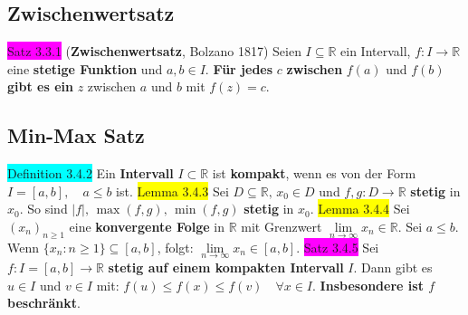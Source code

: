 \documentclass[landscape, 10pt]{article}
\newcommand{\R}{\mathbb{R}}
\begin{document}
\begin{multicols}{3}
\subsection{Zwischenwertsatz}
\colorbox{magenta}{Satz 3.3.1} (\textbf{Zwischenwertsatz}, Bolzano 1817) Seien 
                \textcolor{NavyBlue}{$I\subseteq\R$} ein Intervall, 
                \textcolor{NavyBlue}{$f:I\longrightarrow\R$} 
                eine \textbf{stetige Funktion} und 
         \textcolor{NavyBlue}{$a,b\in I$}. 
                \textbf{Für jedes} \textcolor{NavyBlue}{$c$} \textbf{zwischen} 
                \textcolor{NavyBlue}{$f(a)$} und \textcolor{NavyBlue}{$f(b)$} 
                \textbf{gibt es ein} \textcolor{NavyBlue}{$z$} 
                zwischen \textcolor{NavyBlue}{$a$} und \textcolor{NavyBlue}{$b$} mit 
                \textcolor{NavyBlue}{$f(z)=c$}.
\subsection{Min-Max Satz}
\colorbox{cyan}{Definition 3.4.2} Ein \textbf{Intervall} $I\subset\R$ ist 
                \textbf{kompakt}, wenn es 
                von der Form \textcolor{NavyBlue}{$I=[a,b],\quad a\leqslant b$} ist.
\colorbox{yellow}{Lemma 3.4.3} Sei \textcolor{NavyBlue}{$D\subseteq\R,\,x_0\in D$} und 
                \textcolor{NavyBlue}{$f,g:D\longrightarrow\R$} 
                \textbf{stetig} in \textcolor{NavyBlue}{$x_0$}. So sind 
                \textcolor{NavyBlue}{
                $|f|,\,\max(f,g),\,\min(f,g)$} \textbf{stetig} in \textcolor{NavyBlue}{$x_0$}.
\colorbox{yellow}{Lemma 3.4.4} Sei \textcolor{NavyBlue}{$(x_n)_{n\geqslant1}$}
                eine \textbf{konvergente Folge} in 
                $\R$ mit Grenzwert 
                \textcolor{NavyBlue}{$\lim\limits_{n\to\infty}x_n\in\R$}. 
                Sei \textcolor{NavyBlue}{$a\leqslant b$}. 
         Wenn \textcolor{NavyBlue}{$\{x_n:n\geqslant1\}\subseteq[a,b]$}, folgt: 
                \textcolor{NavyBlue}{$\lim\limits_{n\to\infty}x_n\in[a,b]$}. 
\colorbox{magenta}{Satz 3.4.5} Sei \textcolor{NavyBlue}{$f:I=[a,b]\longrightarrow\R$}
                \textbf{stetig auf einem kompakten Intervall} \textcolor{NavyBlue}{$I$}. 
                Dann gibt es \textcolor{NavyBlue}{$u\in I$} und 
                \textcolor{NavyBlue}{$v\in I$} mit: 
         \textcolor{NavyBlue}{$f(u)\leqslant f(x)\leqslant f(v)\quad\forall x\in I$}. 
                \textbf{Insbesondere ist \textcolor{NavyBlue}{$f$} beschränkt}.

\end{multicols}
\end{document}
